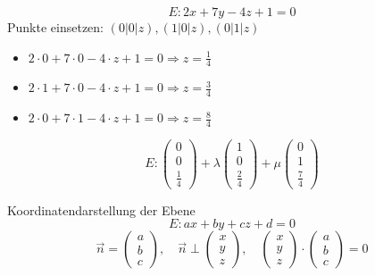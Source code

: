 \begin{example}
    $$E: 2x + 7y - 4z + 1 = 0$$
    Punkte einsetzen: $(0|0|z), (1|0|z), (0|1|z)$
    \vspace*{2mm}
    \begin{itemize}
        \item $2 \cdot 0 + 7 \cdot 0 - 4 \cdot z + 1 = 0 \Rightarrow z = \frac{1}{4}$
        \item $2 \cdot 1 + 7 \cdot 0 - 4 \cdot z + 1 = 0 \Rightarrow z = \frac{3}{4}$
        \item $2 \cdot 0 + 7 \cdot 1 - 4 \cdot z + 1 = 0 \Rightarrow z = \frac{8}{4}$
    \end{itemize}
    \vspace*{2mm}
    $$E: \begin{pmatrix} 0 \\ 0 \\ \frac{1}{4} \end{pmatrix} +
    \lambda \begin{pmatrix} 1 \\ 0 \\ \frac{2}{4} \end{pmatrix} +
    \mu \begin{pmatrix} 0 \\ 1 \\ \frac{7}{4} \end{pmatrix}$$
\end{example}

\begin{concept}{Koordinatendarstellung} der Ebene
    $$E: ax + by + cz + d = 0$$
    $$\vec{n} = \begin{pmatrix} a \\ b \\ c \end{pmatrix}, \quad
    \vec{n} \perp \begin{pmatrix} x \\ y \\ z \end{pmatrix}, \quad
    \begin{pmatrix} x \\ y \\ z \end{pmatrix} \cdot \begin{pmatrix} a \\ b \\ c \end{pmatrix} = 0$$
\end{concept}

